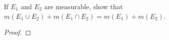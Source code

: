 \begin{problem}
  If $E_1$ and $E_2$ are measurable, show that
  $m(E_1\cup E_2)+m(E_1\cap E_2)=m(E_1)+m(E_2)$.
\end{problem}
\begin{proof}
\end{proof}

